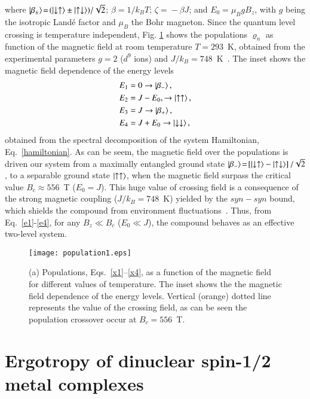 \documentclass[aps,prl,epsfigure,twocolumn,superscriptaddress]{revtex4-1}
\newcommand{\1}{\mathbbm{1}}
\begin{document}
where $\ket{\beta_{\pm}}\!=\!(\ket{\downarrow\uparrow}\pm\ket{\uparrow\downarrow})/\sqrt{2}$; $\beta = 1/k_BT$; ${\zeta}\!=\! -\beta J$; and  $E_{0}\!=\!\mu_B g B_z$, with $g$ being the isotropic Land\'{e} factor and $\mu_B$ the Bohr magneton. Since the quantum level crossing is temperature independent, Fig. \ref{population} shows the populations $\varrho_{n}$ as function of the magnetic field at room temperature $T=293$~K, obtained from the experimental parameters $g=2$ ($d^{9}$ ions) and $J/k_{B}\!=\!748$~K~\cite{cruz}. The inset shows the magnetic field dependence of the energy levels
\begin{align}
E_{1}&= 0 \rightarrow \ket{\beta_{-}}, \label{e1}\\
E_{2}&=J - E_{0}, \rightarrow \ket{\uparrow\uparrow},\label{e2}\\
E_{3}&=J \rightarrow \ket{\beta_{+}},\label{e3}\\
E_{4}&=J+E_{0} \rightarrow \ket{\downarrow\downarrow}, \label{e4}
\end{align}
obtained from the spectral decomposition of the system Hamiltonian, Eq.~\eqref{hamiltonian}. As can be seem, the magnetic field over the populations  is driven our system from a maximally entangled ground state $\ket{\beta_{-}}\!=\!\left[\ket{\downarrow\uparrow} - \ket{\uparrow\downarrow} \right]/\sqrt{2}$, to a separable ground state $\ket{\uparrow\uparrow}$,  when the magnetic field surpass the critical value $B_c\approx 556$~T ($E_{0}\!=\! J$). This huge value of crossing field is a consequence of the strong magnetic coupling ($J/k_{B}\!=\!748$~K) yielded by the $syn-syn$ bound, which shields the compound from environment fluctuations~\cite{mario2,kova2020unconventional,cruz2020quantifying,souza2,cruz2017influence}. Thus, from Eq.~\eqref{e1}-\eqref{e4}, for any $B_{z}\ll B_{c}$ ($E_{0}\ll J$), the compound behaves as an effective two-level system. 
\begin{figure}[!ht]
	\centering
	{\texttt{[image: population1.eps]}}
	\caption{(a) Populations, Eqs.~\eqref{x1}--\eqref{x4}, as a function of the magnetic field for different values of temperature.  The inset shows the the magnetic field dependence of the energy levels. Vertical (orange) dotted line represents the  value of the crossing field, as can be seen the population crossover occur at $B_c = 556$~T.}
	\label{population}
\end{figure}

\section{Ergotropy of dinuclear spin-1/2 metal complexes}
\end{document}
